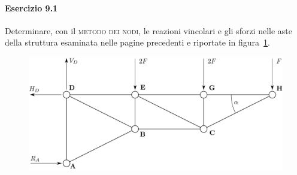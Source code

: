 \paragraph{Esercizio 9.1}
Determinare, con il \textsc{metodo dei nodi}, le reazioni vincolari e gli sforzi nelle aste della struttura esaminata nelle pagine precedenti e riportate in figura~\ref{Esercizio9-1-1}. 
\renewcommand{\thefigure}{9.1~-~1}
\begin{figure}[h!]
\centering
\includegraphics[width=\textwidth]{Immagini/Parte_9/Esercizio9_1/Esercizio9_1_1.pdf}
\caption{}
\label{Esercizio9-1-1}
\end{figure}

